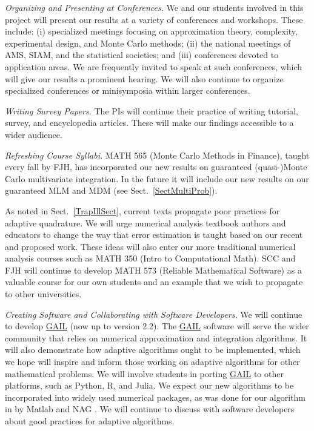 \documentclass[11pt]{NSFamsart}
\newcommand{\GAIL}{\hyperlink{GAILlink}{GAIL}\xspace}
\newcommand{\Matlab}{{\sc Matlab}\xspace}
\begin{document}
\emph{Organizing and Presenting at Conferences.}
We and our students involved in this project will present our results at a variety of conferences and 
workshops.  These include: (i) specialized meetings focusing on approximation theory, complexity, 
experimental design, and Monte Carlo methods; (ii) the national meetings of AMS, SIAM, and the 
statistical societies; and (iii) conferences devoted to application areas.  We are frequently invited to 
speak at such conferences, which will give our results a prominent hearing. We will also continue to 
organize specialized conferences or minisymposia within larger conferences.

\emph{Writing Survey Papers.}
The PIs will continue their practice of writing tutorial, survey, and encyclopedia articles.  These will 
make our findings accessible to a wider audience.

\emph{Refreshing Course Syllabi.}
MATH 565 (Monte Carlo Methods in Finance), taught every fall by FJH, has incorporated our new 
results on guaranteed (quasi-)Monte Carlo multivariate integration. In the future it will include our 
new results on our guaranteed MLM and MDM (see Sect.\ \ref{SectMultiProb}).

As noted in Sect.\ \ref{TrapIllSect}, current texts propagate poor practices for 
adaptive quadrature.  We will urge numerical analysis textbook authors and educators to change the 
way that error estimation is taught based on our recent and proposed work.  These ideas will also 
enter our more traditional numerical analysis courses such as MATH 350 (Intro to Computational 
Math).  SCC and FJH will continue to develop MATH 573 (Reliable Mathematical Software) as a 
valuable course for our own students and an example that we wish to propagate to other 
universities.

\emph{Creating Software and Collaborating with Software Developers.}
We will continue to develop \GAIL \citep{ChoEtal17b} (now up to version 2.2).  The \GAIL software 
will 
serve the wider community that relies on numerical approximation and integration algorithms.  It will 
also demonstrate how adaptive algorithms ought to be implemented, which we hope will inspire and 
inform those working on adaptive algorithms for other mathematical problems.  We will involve 
students in porting \GAIL to other platforms, such as Python, R, and Julia.  We expect our 
new algorithms to be incorporated into widely used numerical packages, as was done for our 
algorithm in \cite{HonHic00a} by \Matlab \citep{MAT9.3} and NAG \citep{NAG23}.  We will continue 
to discuss with software developers about good practices for adaptive algorithms.
\end{document}
